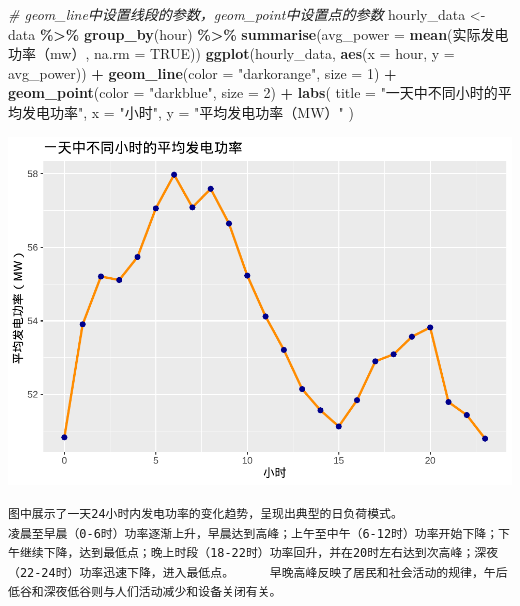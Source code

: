 \documentclass[
]{ctexart}
\newenvironment{Shaded}{\begin{snugshade}}{\end{snugshade}}
\newcommand{\AttributeTok}[1]{\textcolor[rgb]{0.13,0.29,0.53}{#1}}
\newcommand{\CommentTok}[1]{\textcolor[rgb]{0.56,0.35,0.01}{\textit{#1}}}
\newcommand{\ConstantTok}[1]{\textcolor[rgb]{0.56,0.35,0.01}{#1}}
\newcommand{\DecValTok}[1]{\textcolor[rgb]{0.00,0.00,0.81}{#1}}
\newcommand{\FunctionTok}[1]{\textcolor[rgb]{0.13,0.29,0.53}{\textbf{#1}}}
\newcommand{\NormalTok}[1]{#1}
\newcommand{\OtherTok}[1]{\textcolor[rgb]{0.56,0.35,0.01}{#1}}
\newcommand{\SpecialCharTok}[1]{\textcolor[rgb]{0.81,0.36,0.00}{\textbf{#1}}}
\newcommand{\StringTok}[1]{\textcolor[rgb]{0.31,0.60,0.02}{#1}}
\begin{document}
\begin{Shaded}
\begin{Highlighting}[]
\CommentTok{\# geom\_line中设置线段的参数，geom\_point中设置点的参数}
\NormalTok{hourly\_data }\OtherTok{\textless{}{-}}\NormalTok{ data }\SpecialCharTok{\%\textgreater{}\%}
  \FunctionTok{group\_by}\NormalTok{(hour) }\SpecialCharTok{\%\textgreater{}\%}
  \FunctionTok{summarise}\NormalTok{(}\AttributeTok{avg\_power =} \FunctionTok{mean}\NormalTok{(}\StringTok{\textasciigrave{}}\AttributeTok{实际发电功率（mw）}\StringTok{\textasciigrave{}}\NormalTok{, }\AttributeTok{na.rm =} \ConstantTok{TRUE}\NormalTok{))}
\FunctionTok{ggplot}\NormalTok{(hourly\_data, }\FunctionTok{aes}\NormalTok{(}\AttributeTok{x =}\NormalTok{ hour, }\AttributeTok{y =}\NormalTok{ avg\_power)) }\SpecialCharTok{+}
  \FunctionTok{geom\_line}\NormalTok{(}\AttributeTok{color =} \StringTok{"darkorange"}\NormalTok{, }\AttributeTok{size =} \DecValTok{1}\NormalTok{) }\SpecialCharTok{+}
  \FunctionTok{geom\_point}\NormalTok{(}\AttributeTok{color =} \StringTok{"darkblue"}\NormalTok{, }\AttributeTok{size =} \DecValTok{2}\NormalTok{) }\SpecialCharTok{+}
  \FunctionTok{labs}\NormalTok{(}
    \AttributeTok{title =} \StringTok{"一天中不同小时的平均发电功率"}\NormalTok{,}
    \AttributeTok{x =} \StringTok{"小时"}\NormalTok{,}
    \AttributeTok{y =} \StringTok{"平均发电功率（MW）"}
\NormalTok{  )}
\end{Highlighting}
\end{Shaded}

\includegraphics{1_files/figure-latex/unnamed-chunk-3-1.pdf}

\begin{verbatim}
图中展示了一天24小时内发电功率的变化趋势，呈现出典型的日负荷模式。
凌晨至早晨（0-6时）功率逐渐上升，早晨达到高峰；上午至中午（6-12时）功率开始下降；下午继续下降，达到最低点；晚上时段（18-22时）功率回升，并在20时左右达到次高峰；深夜（22-24时）功率迅速下降，进入最低点。     早晚高峰反映了居民和社会活动的规律，午后低谷和深夜低谷则与人们活动减少和设备关闭有关。
\end{verbatim}
\end{document}

